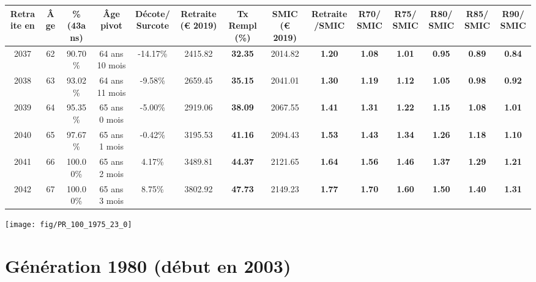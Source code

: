 \begin{adjustbox}{max width=\textwidth} 
\begin{tabular}[htb]{|c|c||c|c|c||c|c||c|c||c|c|c|c|c|} 
\hline 
 Retraite en &  Âge &  \%(43ans) &  Âge pivot &  Décote/Surcote &  Retraite (\euro{} 2019) &  Tx Rempl(\%) &  SMIC (\euro{} 2019) &  Retraite/SMIC &  R70/SMIC &  R75/SMIC &  R80/SMIC &  R85/SMIC &  R90/SMIC \\ 
\hline \hline 
 2037 &  62 &  90.70\% &  64 ans 10 mois &  -14.17\% &  2415.82 &  {\bf 32.35} &  2014.82 &  {\bf 1.20} &  {\bf 1.08} &  {\bf 1.01} &  {\bf {\color{red} 0.95}} &  {\bf {\color{red} 0.89}} &  {\bf {\color{red} 0.84}} \\ 
\hline 
 2038 &  63 &  93.02\% &  64 ans 11 mois &  -9.58\% &  2659.45 &  {\bf 35.15} &  2041.01 &  {\bf 1.30} &  {\bf 1.19} &  {\bf 1.12} &  {\bf 1.05} &  {\bf {\color{red} 0.98}} &  {\bf {\color{red} 0.92}} \\ 
\hline 
 2039 &  64 &  95.35\% &  65 ans 0 mois &  -5.00\% &  2919.06 &  {\bf 38.09} &  2067.55 &  {\bf 1.41} &  {\bf 1.31} &  {\bf 1.22} &  {\bf 1.15} &  {\bf 1.08} &  {\bf 1.01} \\ 
\hline 
 2040 &  65 &  97.67\% &  65 ans 1 mois &  -0.42\% &  3195.53 &  {\bf 41.16} &  2094.43 &  {\bf 1.53} &  {\bf 1.43} &  {\bf 1.34} &  {\bf 1.26} &  {\bf 1.18} &  {\bf 1.10} \\ 
\hline 
 2041 &  66 &  100.00\% &  65 ans 2 mois &  4.17\% &  3489.81 &  {\bf 44.37} &  2121.65 &  {\bf 1.64} &  {\bf 1.56} &  {\bf 1.46} &  {\bf 1.37} &  {\bf 1.29} &  {\bf 1.21} \\ 
\hline 
 2042 &  67 &  100.00\% &  65 ans 3 mois &  8.75\% &  3802.92 &  {\bf 47.73} &  2149.23 &  {\bf 1.77} &  {\bf 1.70} &  {\bf 1.60} &  {\bf 1.50} &  {\bf 1.40} &  {\bf 1.31} \\ 
\hline 
\hline 
\end{tabular} 
\end{adjustbox} 
 
 \vspace{0.1cm} 

 {\hspace{-2.2cm}\texttt{[image: fig/PR\_100\_1975\_23\_0]}} 

\newpage 
 
\section{Génération 1980 (début en 2003)\label{PR_100_1980_23_0}} 
 
